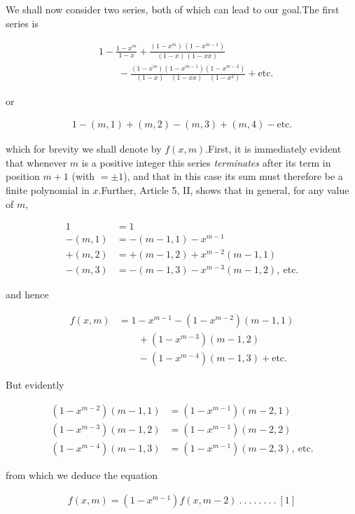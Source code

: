 \clearpage{}

We shall now consider two series, both of which can lead to our goal.\quad The first series is

\[
\begin{aligned}
&1-\frac{1-x^m}{1-x}+\frac{(1-x^m)\,(1-x^{m-1})}{(1-x)\,(1-xx)}\\
&\qquad-\frac{(1-x^m)(1-x^{m-1})(1-x^{m-2})}{(1-x)\quad(1-xx)\quad(1-x^3)}+\text{etc.}
\end{aligned}
\]

or

\[
\begin{aligned}
1-(m,1)+(m,2)-(m,3)+(m,4)-\text{etc.}
\end{aligned}
\]

which for brevity we shall denote by $f(x,m)$.\quad First, it is immediately evident that whenever $m$ is a positive integer this series \emph{terminates} after its term in position $m+1$ (with $=\pm1$), and that in this case its sum must therefore be a finite polynomial in $x$.\quad Further, Article 5, II, shows that in general, for any value of $m$,

\[
\begin{aligned}
1&=1\\
-(m,1)&=-(m-1,1)-x^{m-1}\\
+(m,2)&=+(m-1,2)+x^{m-2}(m-1,1)\\
-(m,3)&=-(m-1,3)-x^{m-3}(m-1,2),\ \text{etc.}
\end{aligned}
\]

and hence

\[
\begin{aligned}
f(x,m)&=1-x^{m-1}-(1-x^{m-2})(m-1,1)\\
&\qquad+(1-x^{m-3})(m-1,2)\\
&\qquad-(1-x^{m-4})(m-1,3)+\text{etc.}
\end{aligned}
\]

But evidently

\[
\begin{aligned}
(1-x^{m-2})(m-1,1)&=(1-x^{m-1})(m-2,1)\\
(1-x^{m-3})(m-1,2)&=(1-x^{m-1})(m-2,2)\\
(1-x^{m-4})(m-1,3)&=(1-x^{m-1})(m-2,3),\ \text{etc.}
\end{aligned}
\]

from which we deduce the equation

\[
\begin{aligned}
f(x,m)=(1-x^{m-1})f(x,m-2)\ .\ .\ .\ .\ .\ .\ .\ .\ [1]
\end{aligned}
\]

